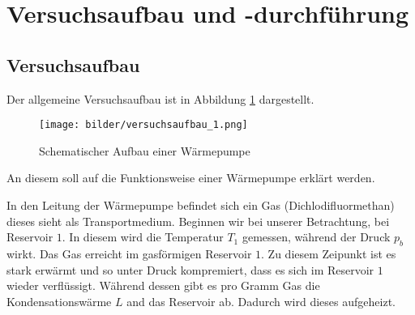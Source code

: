\section{Versuchsaufbau und -durchführung}

\subsection{Versuchsaufbau}

Der allgemeine Versuchsaufbau ist in Abbildung \ref{fig:aufbau_warmepumpe} dargestellt.


\begin{figure}
\centering
\texttt{[image: bilder/versuchsaufbau\_1.png]}
\caption{Schematischer Aufbau einer Wärmepumpe}
\label{fig:aufbau_warmepumpe}
\end{figure}


An diesem soll auf die Funktionsweise einer Wärmepumpe erklärt werden.

In den Leitung der Wärmepumpe befindet sich ein Gas (Dichlodifluormethan) 
dieses sieht als Transportmedium.
Beginnen wir bei unserer Betrachtung, bei Reservoir $1$.
In diesem wird die Temperatur $T_1$ gemessen, während der Druck $p_b$ wirkt.
Das Gas erreicht im gasförmigen Reservoir $1$. Zu diesem Zeipunkt ist es
stark erwärmt und so unter Druck kompremiert, dass es sich im Reservoir $1$ wieder verflüssigt.
Während dessen gibt es pro Gramm Gas die Kondensationswärme $L$ and das Reservoir ab.
Dadurch wird dieses aufgeheizt.


